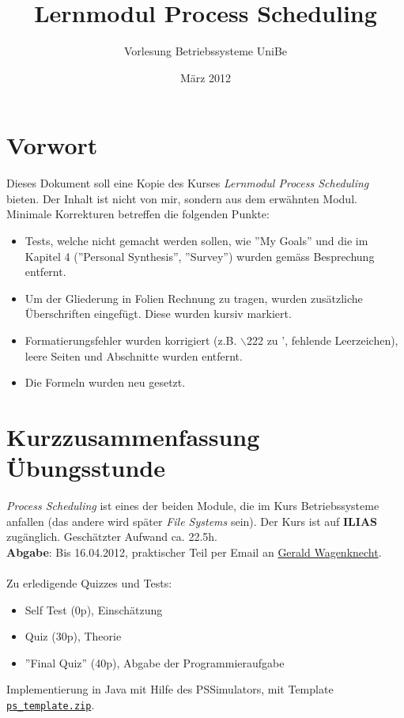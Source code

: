 \documentclass[11pt,a4paper]{scrreprt}
\title{Lernmodul Process Scheduling}
\author{Vorlesung Betriebssysteme UniBe}
\date{März 2012}
\begin{document}
\maketitle
\tableofcontents
\newpage

\section*{Vorwort}
Dieses Dokument soll eine Kopie des Kurses \textit{Lernmodul Process Scheduling} bieten. Der Inhalt ist nicht von mir, sondern aus dem erwähnten Modul. \\
Minimale Korrekturen betreffen die folgenden Punkte:
\begin{itemize}
\item Tests, welche nicht gemacht werden sollen, wie ''My Goals'' und die im Kapitel 4 (''Personal Synthesis'', ''Survey'') wurden gemäss Besprechung entfernt.
\item Um der Gliederung in Folien Rechnung zu tragen, wurden zusätzliche Überschriften eingefügt. Diese wurden kursiv markiert.
\item Formatierungsfehler wurden korrigiert (z.B. $\backslash$222 zu ', fehlende Leerzeichen), leere Seiten und Abschnitte wurden entfernt.
\item Die Formeln wurden neu gesetzt.
\end{itemize}

\section*{Kurzzusammenfassung Übungsstunde}
\textit{Process Scheduling} ist eines der beiden Module, die im Kurs Betriebssysteme anfallen (das andere wird später \textit{File Systems} sein). Der Kurs ist auf \textbf{ILIAS} zugänglich. Geschätzter Aufwand ca. 22.5h. \\
\textbf{Abgabe}: Bis 16.04.2012, praktischer Teil per Email an \href{mailto:wagen@iam.unibe.ch}{Gerald Wagenknecht}.\\\\
Zu erledigende Quizzes und Tests:
\begin{itemize}
\item Self Test (0p), Einschätzung
\item Quiz (30p), Theorie
\item ''Final Quiz'' (40p), Abgabe der Programmieraufgabe
\end{itemize}
Implementierung in Java mit Hilfe des PSSimulators, mit Template \href{https://ilias.unibe.ch/repository.php?ref_id=402886&cmd=sendfile}{\texttt{ps\_template.zip}}.
\end{document}
